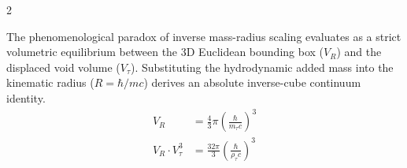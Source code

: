 \documentclass[11pt, a4paper]{article}
\newcounter{cheatnum}
\begin{document}
\begin{multicols}{2}
\begin{tcolorbox}[cheatbox, title={\refstepcounter{cheatnum}\label{box:volumetric_inverse_cube}\thecheatnum. The Volumetric Inverse-Cube Identity \scriptsize\hfill\hyperref[sec:deriv_volumetric_inverse_cube]{[Proof $\downarrow$]}}]
The phenomenological paradox of inverse mass-radius scaling evaluates as a strict volumetric equilibrium between the 3D Euclidean bounding box ($V_R$) and the displaced void volume ($V_\tau$). Substituting the hydrodynamic added mass into the kinematic radius ($R = \hbar/mc$) derives an absolute inverse-cube continuum identity. 
\begin{align}
    V_R &= \frac{4}{3}\pi \left( \frac{\hbar}{m_\tau c} \right)^3 \label{eq:bounding_volume} \\
    V_R \cdot V_{\tau}^3 &= \frac{32\pi}{3} \left( \frac{\hbar}{\rho_{\tau} c} \right)^3 \label{eq:volumetric_inverse_cube}
\end{align}
\end{tcolorbox}


\end{multicols}
\end{document}
